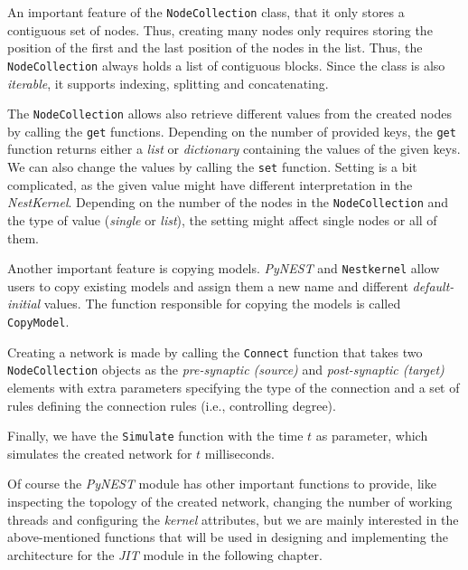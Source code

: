 An important feature of the \texttt{NodeCollection} class, that it only stores a contiguous set of nodes. Thus, creating many nodes only requires storing the position of the first and the last position of the nodes in the list. Thus, the \texttt{NodeCollection} always holds a list of contiguous blocks. Since the class is also \emph{iterable}, it supports indexing, splitting and concatenating.  


The \texttt{NodeCollection} allows also retrieve different values from the created nodes by calling the \texttt{get} functions. Depending on the number of provided keys, the \texttt{get} function returns either a \emph{list} or \emph{dictionary} containing the values of the given keys. We can also change the values by calling the \texttt{set} function. Setting is a bit complicated, as the given value might have different interpretation in the \emph{NestKernel}. Depending on the number of the nodes in the \texttt{NodeCollection} and the type of value (\emph{single} or \emph{list}), the setting might affect single nodes or all of them.

Another important feature is copying models. \emph{PyNEST} and \texttt{Nestkernel} allow users to copy existing models and assign them a new name and different \emph{default-initial} values. The function responsible for copying the models is called \texttt{CopyModel}.

Creating a network is made by calling the \texttt{Connect} function that takes two \texttt{NodeCollection} objects as the \emph{pre-synaptic (source)} and \emph{post-synaptic (target)} elements with extra parameters specifying the type of the connection and a set of rules defining the connection rules (i.e., controlling degree).

Finally, we have the \texttt{Simulate} function  with the time $t$ as parameter, which simulates the created network for $t$ milliseconds.

Of course the \emph{PyNEST} module has other important functions to provide, like inspecting the topology of the created network, changing the number of working threads and configuring the \emph{kernel} attributes, but we are mainly interested in the above-mentioned functions that will be used in designing and implementing the architecture for the \emph{JIT} module in the following chapter.
 
 

